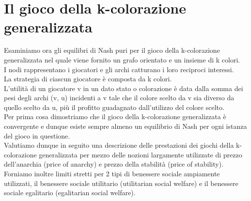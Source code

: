 \chapter{Il gioco della k-colorazione generalizzata}
\justify
Esaminiamo ora gli equilibri di Nash puri per il gioco della k-colorazione generalizzata nel quale viene fornito un grafo orientato e un insieme di k colori.\\
I nodi rappresentano i giocatori e gli archi catturano i loro reciproci interessi.\\
La strategia di ciascun giocatore è composta da k colori.\\
L'utilità di un giocatore v in un dato stato o colorazione è data dalla somma dei pesi degli archi (v, u) incidenti a v tale che il colore scelto da v sia diverso da quello scelto da u, più il profitto guadagnato dall'utilizzo del colore scelto.\\
Per prima cosa dimostriamo che il gioco della k-colorazione generalizzata è convergente e dunque esiste sempre almeno un equilibrio di Nash per ogni istanza del gioco in questione.\\
Valutiamo dunque in seguito una descrizione delle prestazioni dei giochi della k-colorazione generalizzata per mezzo delle nozioni largamente utilizzate di prezzo dell'anarchia (price of anarchy) e prezzo della stabilità (price of stability).\\
Forniamo inoltre limiti stretti per 2 tipi di benessere sociale ampiamente utilizzati, il benessere sociale utilitario (utilitarian social welfare) e il benessere sociale egalitario (egalitarian social welfare).\newline

